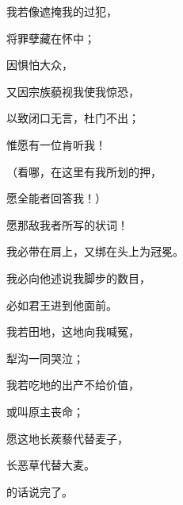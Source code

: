 {\par }{\Q {}我若像{}遮掩我的过犯，
\par }{\Q 将罪孽藏在怀中；
\par }{\Q {}因惧怕大众，
\par }{\Q 又因宗族藐视我使我惊恐，
\par }{\Q 以致闭口无言，杜门不出；
\par }{\Q {}惟愿有一位肯听我！
\par }{\Q （看哪，在这里有我所划的押，
\par }{\Q 愿全能者回答我！）
\par }{\Q {}愿那敌我者所写的状词{}！
\par }{\Q 我必带在肩上，又绑在头上为冠冕。
\par }{\Q {}我必向他述说我脚步的数目，
\par }{\Q 必如君王进到他面前。
\par }{\BB \par }{\Q {}我若{}田地，这地向我喊冤，
\par }{\Q 犁沟一同哭泣；
\par }{\Q {}我若吃地的出产不给价值，
\par }{\Q 或叫原主丧命；
\par }{\Q {}愿这地长蒺藜代替麦子，
\par }{\Q 长恶草代替大麦。
\par }{\BB \par }{的话说完了。

}

